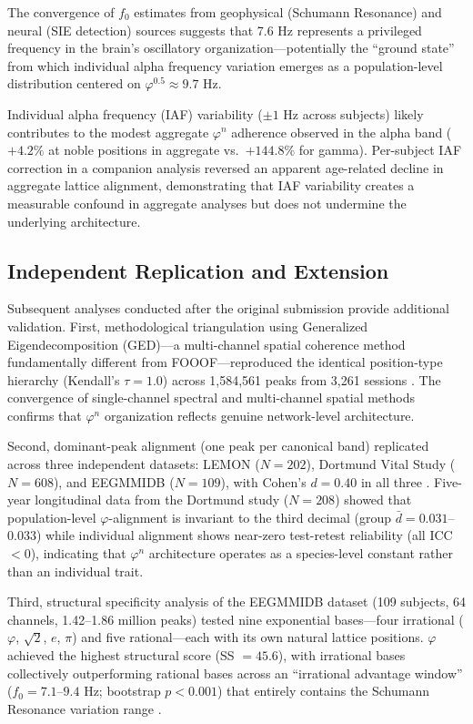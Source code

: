 \documentclass[11pt,a4paper]{article}
\newcommand{\phisym}{\varphi}
\begin{document}
The convergence of $f_0$ estimates from geophysical (Schumann Resonance) and neural (SIE detection) sources suggests that 7.6 Hz represents a privileged frequency in the brain's oscillatory organization---potentially the ``ground state'' from which individual alpha frequency variation emerges as a population-level distribution centered on $\phisym^{0.5} \approx 9.7$ Hz.

Individual alpha frequency (IAF) variability ($\pm 1$ Hz across subjects) likely contributes to the modest aggregate $\phisym^n$ adherence observed in the alpha band ($+4.2\%$ at noble positions in aggregate vs.\ $+144.8\%$ for gamma). Per-subject IAF correction in a companion analysis reversed an apparent age-related decline in aggregate lattice alignment, demonstrating that IAF variability creates a measurable confound in aggregate analyses but does not undermine the underlying architecture.

\subsection{Independent Replication and Extension}

Subsequent analyses conducted after the original submission provide additional validation. First, methodological triangulation using Generalized Eigendecomposition (GED)---a multi-channel spatial coherence method fundamentally different from FOOOF---reproduced the identical position-type hierarchy (Kendall's $\tau = 1.0$) across 1,584,561 peaks from 3,261 sessions \parencite{lacy2026eegmmidb}. The convergence of single-channel spectral and multi-channel spatial methods confirms that $\phisym^n$ organization reflects genuine network-level architecture.

Second, dominant-peak alignment (one peak per canonical band) replicated across three independent datasets: LEMON ($N = 202$), Dortmund Vital Study ($N = 608$), and EEGMMIDB ($N = 109$), with Cohen's $d = 0.40$ in all three \parencite{lacy2026lemon}. Five-year longitudinal data from the Dortmund study ($N = 208$) showed that population-level $\phisym$-alignment is invariant to the third decimal (group $\bar{d} = 0.031$--$0.033$) while individual alignment shows near-zero test-retest reliability (all ICC $< 0$), indicating that $\phisym^n$ architecture operates as a species-level constant rather than an individual trait.

Third, structural specificity analysis of the EEGMMIDB dataset (109 subjects, 64 channels, 1.42--1.86 million peaks) tested nine exponential bases---four irrational ($\phisym$, $\sqrt{2}$, $e$, $\pi$) and five rational---each with its own natural lattice positions. $\phisym$ achieved the highest structural score (SS $= 45.6$), with irrational bases collectively outperforming rational bases across an ``irrational advantage window'' ($f_0 = 7.1$--$9.4$ Hz; bootstrap $p < 0.001$) that entirely contains the Schumann Resonance variation range \parencite{lacy2026eegmmidb}.
\end{document}
